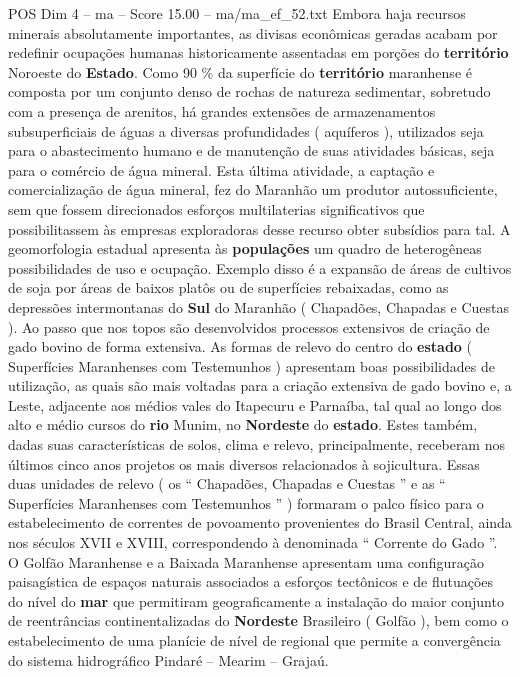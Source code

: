 \begin{textsample}{POS Dim 4 – ma – Score 15.00 – ma/ma\_ef\_52.txt}
Embora haja recursos minerais absolutamente importantes, as divisas econômicas geradas acabam por redefinir ocupações humanas historicamente assentadas em porções do \textbf{território} Noroeste do \textbf{Estado}.
Como 90 \% da superfície do \textbf{território} maranhense é composta por um conjunto denso de rochas de natureza sedimentar, sobretudo com a presença de arenitos, há grandes extensões de armazenamentos subsuperficiais de águas a diversas profundidades ( aquíferos ), utilizados seja para o abastecimento humano e de manutenção de suas atividades básicas, seja para o comércio de água mineral.
Esta última atividade, a captação e comercialização de água mineral, fez do Maranhão um produtor autossuficiente, sem que fossem direcionados esforços multilaterias significativos que possibilitassem às empresas exploradoras desse recurso obter subsídios para tal.
A geomorfologia estadual apresenta às \textbf{populações} um quadro de heterogêneas possibilidades de uso e ocupação.
Exemplo disso é a expansão de áreas de cultivos de soja por áreas de baixos platôs ou de superfícies rebaixadas, como as depressões intermontanas do \textbf{Sul} do Maranhão ( Chapadões, Chapadas e Cuestas ).
Ao passo que nos topos são desenvolvidos processos extensivos de criação de gado bovino de forma extensiva.
As formas de relevo do centro do \textbf{estado} ( Superfícies Maranhenses com Testemunhos ) apresentam boas possibilidades de utilização, as quais são mais voltadas para a criação extensiva de gado bovino e, a Leste, adjacente aos médios vales do Itapecuru e Parnaíba, tal qual ao longo dos alto e médio cursos do \textbf{rio} Munim, no \textbf{Nordeste} do \textbf{estado}.
Estes também, dadas suas características de solos, clima e relevo, principalmente, receberam nos últimos cinco anos projetos os mais diversos relacionados à sojicultura.
Essas duas unidades de relevo ( os “ Chapadões, Chapadas e Cuestas ” e as “ Superfícies Maranhenses com Testemunhos ” ) formaram o palco físico para o estabelecimento de correntes de povoamento provenientes do Brasil Central, ainda nos séculos XVII e XVIII, correspondendo à denominada “ Corrente do Gado ”.
O Golfão Maranhense e a Baixada Maranhense apresentam uma configuração paisagística de espaços naturais associados a esforços tectônicos e de flutuações do nível do \textbf{mar} que permitiram geograficamente a instalação do maior conjunto de reentrâncias continentalizadas do \textbf{Nordeste} Brasileiro ( Golfão ), bem como o estabelecimento de uma planície de nível de regional que permite a convergência do sistema hidrográfico Pindaré – Mearim – Grajaú.

\end{textsample}
